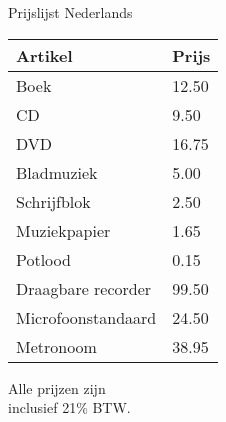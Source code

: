 \documentclass[a4paper]{article}
\begin{document}
\Large{Prijslijst Nederlands}

\vspace{8mm}

\begin{tabular}{ll}\\ \hline
{\bfseries Artikel} &
{\bfseries Prijs} \\ \hline\hline
Boek &12.50 \\CD &9.50 \\DVD &16.75 \\Bladmuziek &5.00 \\Schrijfblok &2.50 \\Muziekpapier &1.65 \\Potlood &0.15 \\Draagbare recorder &99.50 \\Microfoonstandaard &24.50 \\Metronoom &38.95\\\hline
\end{tabular}

Alle prijzen zijn\\inclusief 21\% BTW.
\end{document}
